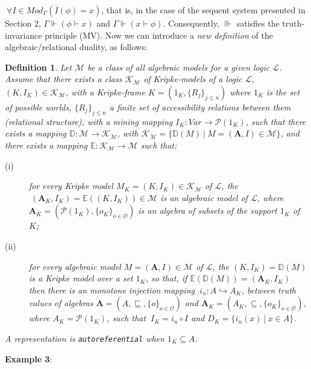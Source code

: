 \documentclass[10pt,twocolumn]{article}
\newcommand{\K}{\mathcal{K}} \renewcommand{\L}{\mathcal{L}}
\newcommand{\M}{\mathcal{M}} \newcommand{\N}{\mathcal{N}}
\renewcommand{\O}{\mathcal{O}} \renewcommand{\P}{\mathcal{P}}
\newtheorem{definition}{Definition}
\begin{document}
$~\forall I \in Mod_{\Gamma}(\overline{I}(\phi) = x)$,
that is, in the case of the sequent system presented in Section 2, $\Gamma \Vdash (\phi
\vdash x)$ and  $\Gamma \Vdash (x \vdash \phi)$. Consequently,
$\Vvdash$ satisfies the truth-invariance principle (MV).
 Now we can introduce a \emph{new definition} of the
algebraic/relational duality, as follows:
\begin{definition} \label{def:abs1}
Let $\M$ be a class of all algebraic models for a given logic $\L$.
Assume that there exists a class $\K_{\M}$ of Kripke-models of a
logic $\L$, $(K,I_K)\in \K_{\M}$, with a Kripke-frame $K = (1_K,
\{R_j\}_{j \leq n})$ where $1_K$
is the set of possible worlds, $\{R_j\}_{j \leq n}$ a finite set of
accessibility relations between them (relational structure), with a
mining mapping $I_K:Var \rightarrow \P(1_K)$,  such that there
exists a mapping $\mathbb{D}:\M \rightarrow \K_{\M}$, with $\K_{\M}
= \{\mathbb{D}(M) ~|~ M = (\textbf{A},I) \in \M\}$, and there exists
a mapping $\mathbb{E}:\K_{\M} \rightarrow \M$ such that:
\begin{description}
                            \item[(i)] for every \emph{Kripke} model $M_K = (K,I_K) \in \K_{\M}$ of
                            $\L$,
                            the $~  (\textbf{A}_K, I_K)= \mathbb{E}((K,I_K))  \in
                            \M$ is an algebraic model of $\L$, where $\textbf{A}_K = (\P(1_K), \{o_K\}_{o \in \O})$ is an algebra
                            of subsets of the support $1_K$ of $K$;
                            \item[(ii)] for every \emph{algebraic} model $M = (\textbf{A},I)
                            \in \M$ of $\L$, the $(K,I_K) = \mathbb{D}(M)$ is a Kripke model over a set
                            $1_K$, so that, if $\mathbb{E}(\mathbb{D}(M))
                            =(\textbf{A}_{K}, I_{K})$ then there is an
                            monotone injection mapping $~i_n:A \hookrightarrow A_{K}$, between truth values of algebras $\textbf{A} = (A, \sqsubseteq, \{o\}_{o \in
                            \O})$
                             and $\textbf{A}_{K} = (A_{K},\subseteq, \{o_{K}\}_{o \in \O})$, where $A_K = \P(1_K)$,
                              such that  $~I_{K} = i_n \circ I$ and $D_K =
                              \{i_n(x)~|~x \in A \}$.
\end{description}
A representation is \verb"autoreferential" when $1_K \subseteq A$.
\end{definition}
 \textbf{Example 3}: \\
\end{document}
